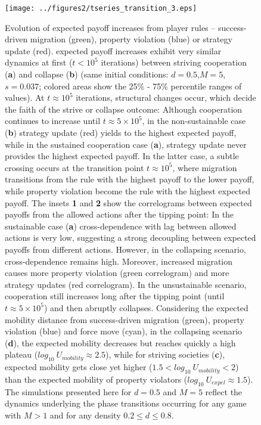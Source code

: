 \begin{figure}[h]
\begin{center}
\centerline{\texttt{[image: ../figures2/tseries\_transition\_3.eps]}}
\caption{Evolution of expected payoff increases from player rules -- success-driven migration (green), property violation (blue) or strategy update (red). expected payoff increases exhibit very similar dynamics at first ($t< 10^5$ iterations) between striving cooperation ({\bf a}) and collapse ({\bf b}) (same initial conditions: $d=0.5$,$M=5$, $s = 0.037$; colored areas show the 25\% - 75\% percentile ranges of values). At $t \approx 10^5$ iterations, structural changes occur, which decide the faith of the strive or collapse outcome: Although cooperation continues to increase until $t \approx 5\times 10^5$, in the non-sustainable case ({\bf b}) strategy update (red) yields to the highest expected payoff, while in the sustained cooperation case ({\bf a}), strategy update never provides the highest expected payoff. In the latter case, a subtle crossing occurs at the transition point  $t \approx 10^5$, where  migration transitions from the rule with the highest payoff to the lower payoff, while property violation become the rule with the highest expected payoff. The insets {\bf 1} and {\bf 2} show the correlograms between expected payoffs from the allowed actions after the tipping point: In the sustainable case ({\bf a}) cross-dependence with lag between allowed actions is very low, suggesting a strong decoupling between expected payoffs from different actions. However, in the collapsing scenario, cross-dependence remains high. Moreover, increased migration causes  more property violation (green correlogram) and more strategy updates (red correlogram). In the unsustainable scenario, cooperation still increases long after the tipping point (until $t \approx 5\times10^{5}$) and then abruptly collapses. Considering the expected mobility distance from success-driven migration (green), property violation (blue) and force move (cyan), in the collapsing scenario ({\bf d}), the expected mobility decreases but reaches quickly a high plateau ($log_{10}~U_{mobility} \approx 2.5$), while for striving societies ({\bf c}), expected mobility gets close yet higher ($1.5 < log_{10}~U_{mobility} < 2$) than the expected mobility of  property violators ($log_{10}~U_{expel} \approx 1.5$). The simulations presented here for $d=0.5$ and $M=5$ reflect the dynamics underlying the phase transitions occurring for any game with $M>1$ and for any density $0.2 \leqslant d \leqslant 0.8$.}
\label{fig:tseries}
\end{center}
\end{figure}

